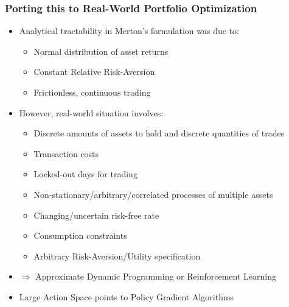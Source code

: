 \documentclass[handout]{beamer}
\begin{document}
\begin{frame}
\frametitle{Porting this to Real-World Portfolio Optimization}
\pause
\begin{itemize}[<+->]
\item Analytical tractability in Merton's formulation was due to:
\begin{itemize}
\item Normal distribution of asset returns
\item Constant Relative Risk-Aversion
\item Frictionless, continuous trading
\end{itemize}
\item However, real-world situation involves:
\begin{itemize}
\item Discrete amounts of assets to hold and discrete quantities of trades
\item Transaction costs
\item Locked-out days for trading
\item Non-stationary/arbitrary/correlated processes of multiple assets
\item Changing/uncertain risk-free rate
\item Consumption constraints
\item Arbitrary Risk-Aversion/Utility specification
\end{itemize}
\item $\Rightarrow$ Approximate Dynamic Programming or Reinforcement Learning
\item Large Action Space points to Policy Gradient Algorithms
\end{itemize}
\end{frame}
\end{document}
